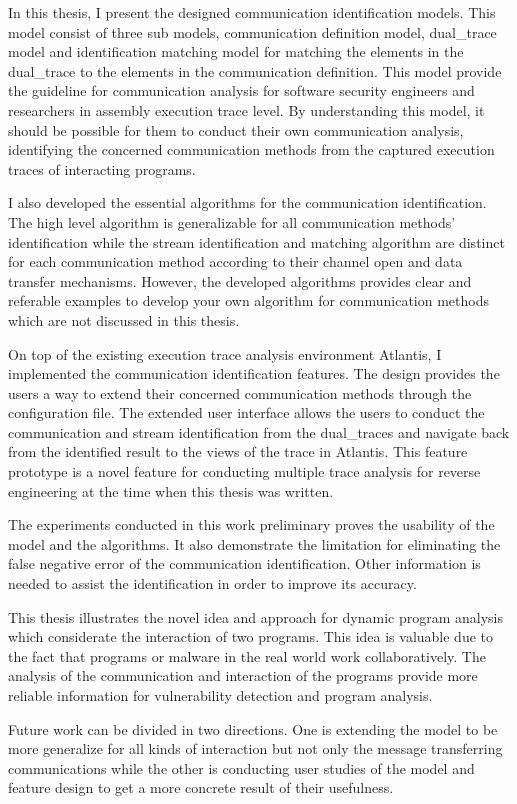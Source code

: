 \label{concl}
In this thesis, I present the designed communication identification models. This model consist of three sub models, communication definition model, dual\_trace model and identification matching model for matching the elements in the dual\_trace to the elements in the communication definition. This model provide the guideline for communication analysis for software security engineers and researchers in assembly execution trace level. By understanding this model, it should be possible for them to conduct their own communication analysis, identifying the concerned communication methods from the captured execution traces of interacting programs.

I also developed the essential algorithms for the communication identification. The high level algorithm is generalizable for all communication methods' identification while  the stream identification and matching algorithm are distinct for each communication method according to their channel open and data transfer mechanisms. However, the developed algorithms provides clear and referable examples to develop your own algorithm for communication methods which are not discussed in this thesis.

On top of the existing execution trace analysis environment Atlantis, I implemented the communication identification features. The design provides the users a way to extend their concerned communication methods through the configuration file. The extended user interface allows the users to conduct the communication and stream identification from the dual\_traces and navigate back from the identified result to the views of the trace in Atlantis. This feature prototype is a novel feature for conducting multiple trace analysis for reverse engineering at the time when this thesis was written. 

The experiments conducted in this work preliminary proves the usability of the model and the algorithms. It also demonstrate the limitation for eliminating the false negative error of the communication identification. Other information is needed to assist the identification in order to improve its accuracy.

This thesis illustrates the novel idea and approach for dynamic program analysis which considerate the interaction of two programs. This idea is valuable due to the fact that programs or malware in the real world work collaboratively. The analysis of the communication and interaction of the programs provide more reliable information for vulnerability detection and program analysis.

Future work can be divided in two directions. One is extending the model to be more generalize for all kinds of interaction but not only the message transferring communications while the other is conducting user studies of the model and feature design to get a more concrete result of their usefulness.

